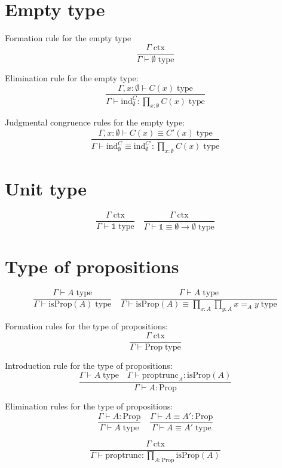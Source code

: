 \documentclass{book}
\begin{document}
\section{Empty type}

Formation rule for the empty type
$$\frac{\Gamma \; \mathrm{ctx}}{\Gamma \vdash \emptyset \; \mathrm{type}}$$

Elimination rule for the empty type:
$$\frac{\Gamma, x:\emptyset \vdash C(x) \; \mathrm{type}}{\Gamma \vdash \mathrm{ind}_\emptyset^C:\prod_{x:\emptyset} C(x) \; \mathrm{type}}$$

Judgmental congruence rules for the empty type:
$$\frac{\Gamma, x:\emptyset \vdash C(x) \equiv C'(x) \; \mathrm{type}}{\Gamma \vdash \mathrm{ind}_\emptyset^C \equiv \mathrm{ind}_\emptyset^{C'}:\prod_{x:\emptyset} C(x) \; \mathrm{type}}$$

\section{Unit type}

$$\frac{\Gamma \; \mathrm{ctx}}{\Gamma \vdash \mathbb{1} \; \mathrm{type}} \quad \frac{\Gamma \; \mathrm{ctx}}{\Gamma \vdash \mathbb{1} \equiv \emptyset \to \emptyset \; \mathrm{type}}$$

\section{Type of propositions}

$$\frac{\Gamma \vdash A \; \mathrm{type}}{\Gamma \vdash \mathrm{isProp}(A) \; \mathrm{type}} \quad \frac{\Gamma \vdash A \; \mathrm{type}}{\Gamma \vdash \mathrm{isProp}(A) \equiv \prod_{x:A} \prod_{y:A} x =_A y \; \mathrm{type}}$$

Formation rules for the type of propositions:
$$\frac{\Gamma \; \mathrm{ctx}}{\Gamma \vdash \mathrm{Prop} \; \mathrm{type}}$$

Introduction rule for the type of propositions:
$$\frac{\Gamma \vdash A \; \mathrm{type} \quad \Gamma \vdash \mathrm{proptrunc}_A:\mathrm{isProp}(A)}{\Gamma \vdash A:\mathrm{Prop}}$$

Elimination rules for the type of propositions:
$$\frac{\Gamma \vdash A:\mathrm{Prop}}{\Gamma \vdash A \; \mathrm{type}} \quad \frac{\Gamma \vdash A \equiv A':\mathrm{Prop}}{\Gamma \vdash A \equiv A' \; \mathrm{type}}$$

$$\frac{\Gamma \; \mathrm{ctx}}{\Gamma \vdash \mathrm{proptrunc}:\prod_{A:\mathrm{Prop}} \mathrm{isProp}(A)}$$
\end{document}
